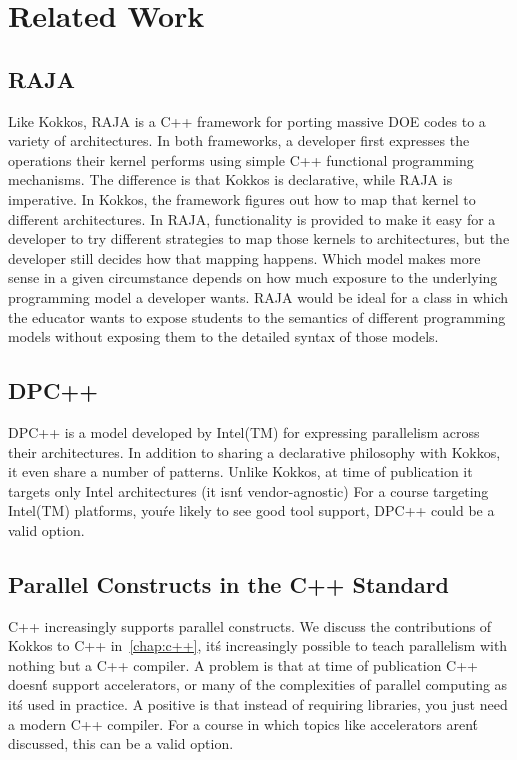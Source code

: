 \section{Related Work}\label{chap:related}
\subsection{RAJA}
Like Kokkos, RAJA is a C++ framework for porting massive DOE codes to a variety of architectures. In both frameworks, a developer first expresses the operations their kernel performs using simple C++ functional programming mechanisms. The difference is that Kokkos is declarative, while RAJA is imperative. In Kokkos, the framework figures out how to map that kernel to different architectures. In RAJA, functionality is provided to make it easy for a developer to try different strategies to map those kernels to architectures, but the developer still decides how that mapping happens. Which model makes more sense in a given circumstance depends on how much exposure to the underlying programming model a developer wants. RAJA would be ideal for a class in which the educator wants to expose students to the semantics of different programming models without exposing them to the detailed syntax of those models.
\subsection{DPC++}
DPC++ is a model developed by Intel(TM) for expressing parallelism across their architectures. In addition to sharing a declarative philosophy with Kokkos, it even share a number of patterns. Unlike Kokkos, at time of publication it targets only Intel architectures (it isn\'t vendor-agnostic) For a course targeting Intel(TM) platforms, you\'re likely to see good tool support, DPC++ could be a valid option.
\subsection{Parallel Constructs in the C++ Standard}
C++ increasingly supports parallel constructs. We discuss the contributions of Kokkos to C++ in~\ref{chap:c++}, it\'s increasingly possible to teach parallelism with nothing but a C++ compiler. A problem is that at time of publication C++ doesn\'t support accelerators, or many of the complexities of parallel computing as it\'s used in practice. A positive is that instead of requiring libraries, you just need a modern C++ compiler. For a course in which topics like accelerators aren\'t discussed, this can be a valid option.

